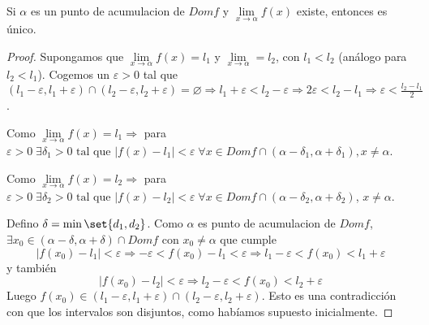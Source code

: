 \begin{theorem}
	Si \(\alpha\) es un punto de acumulacion de \(Domf \) y \(\lim\limits_{x  \to \alpha} f(x )\) existe, entonces es único.
\end{theorem}
\begin{proof}
	Supongamos que \(\lim\limits_{x \to \alpha} f(x) = l_1 \) y \(\lim\limits_{x \to \alpha} = l_2 \), con \(l_1 < l_2 \) (análogo para \(l_2 < l_1\)). Cogemos un \(\varepsilon > 0 \) tal que \((l_1 - \varepsilon, l_1 + \varepsilon) \cap (l_2 - \varepsilon, l_2 + \varepsilon) = \varnothing \Rightarrow l_1 + \varepsilon < l_2 - \varepsilon \Rightarrow 2\varepsilon < l_2 - l_1 \Rightarrow \varepsilon < \frac{l_2 - l_1 }{2}\). 
	
	Como \(\lim\limits_{x  \to \alpha} f(x) = l_1 \Rightarrow  \) para \(\varepsilon > 0 \; \exists \delta_1 > 0 \text{ tal que }  \left\vert f(x) - l_1  \right\vert < \varepsilon \; \forall x \in Domf \cap (\alpha - \delta_1, \alpha + \delta_1 ), x \neq \alpha\). 
	
	Como \(\lim\limits_{x  \to \alpha } f(x) = l_2 \Rightarrow \) para \(\varepsilon > 0 \; \exists \delta_2 > 0 \text{ tal que }  \left\vert f(x) - l_2  \right\vert < \varepsilon \; \forall x \in Domf \cap (\alpha - \delta_2, \alpha + \delta_2 )\), \(x \neq \alpha \).
	
	Defino \(\delta = \min\set{d_1, d_2 }\). Como \(\alpha \) es punto de acumulacion de \(Domf \), \(\exists x_0 \in (\alpha - \delta, \alpha + \delta) \cap Domf \) con \(x_0 \neq \alpha\) que cumple
	\[
		\left\vert f(x_0) - l_1  \right\vert < \varepsilon \Rightarrow - \varepsilon < f(x_0) - l_1 < \varepsilon \Rightarrow l_1 - \varepsilon < f(x_0) < l_1 + \varepsilon
	\]
	y también
	\[
		\left\vert f(x_0) - l_2  \right\vert < \varepsilon \Rightarrow l_2 - \varepsilon < f(x_0) < l_2 + \varepsilon
	\]
	Luego \(f(x_0) \in (l_1 - \varepsilon, l_1 + \varepsilon) \cap (l_2 - \varepsilon, l_2 + \varepsilon)\). Esto es una contradicción con que los intervalos son disjuntos, como habíamos supuesto inicialmente. 
\end{proof}


